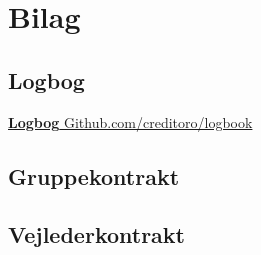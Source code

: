 \section{Bilag}

\subsection{Logbog}
\href{https://github.com/creditoro/logbook}{\textbf{Logbog} Github.com/creditoro/logbook}


\newpage
\subsection{Gruppekontrakt}


\newpage
\subsection{Vejlederkontrakt}


